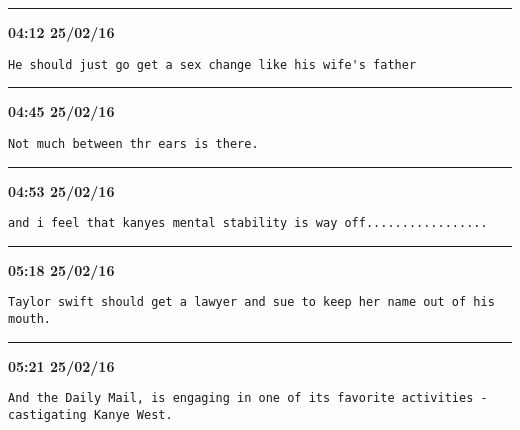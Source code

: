 \hrule%

\begin{adjustwidth}{0cm}{0cm}
\footnotesize \textbf{04:12 25/02/16}

\begin{lstlisting}[breaklines, breakatwhitespace, basicstyle=\small, frame=leftline]
He should just go get a sex change like his wife's father
\end{lstlisting}
\end{adjustwidth}

\hrule%

\begin{adjustwidth}{0cm}{0cm}
\footnotesize \textbf{04:45 25/02/16}

\begin{lstlisting}[breaklines, breakatwhitespace, basicstyle=\small, frame=leftline]
Not much between thr ears is there.
\end{lstlisting}
\end{adjustwidth}

\hrule%

\begin{adjustwidth}{0cm}{0cm}
\footnotesize \textbf{04:53 25/02/16}

\begin{lstlisting}[breaklines, breakatwhitespace, basicstyle=\small, frame=leftline]
and i feel that kanyes mental stability is way off.................
\end{lstlisting}
\end{adjustwidth}

\hrule%

\begin{adjustwidth}{0cm}{0cm}
\footnotesize \textbf{05:18 25/02/16}

\begin{lstlisting}[breaklines, breakatwhitespace, basicstyle=\small, frame=leftline]
Taylor swift should get a lawyer and sue to keep her name out of his mouth.
\end{lstlisting}
\end{adjustwidth}

\hrule%

\begin{adjustwidth}{0cm}{0cm}
\footnotesize \textbf{05:21 25/02/16}

\begin{lstlisting}[breaklines, breakatwhitespace, basicstyle=\small, frame=leftline]
And the Daily Mail, is engaging in one of its favorite activities - castigating Kanye West.
\end{lstlisting}
\end{adjustwidth}

